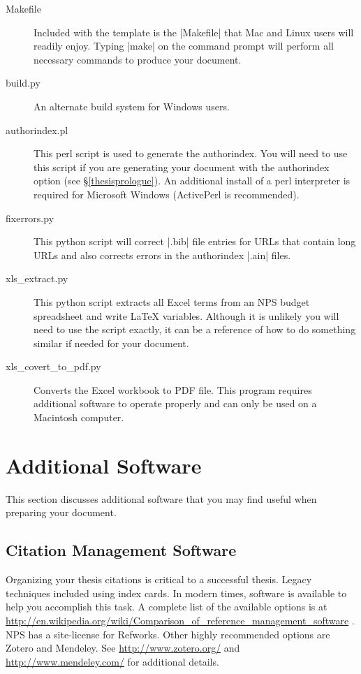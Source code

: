 \begin{description}
\item[Makefile] Included with the template is the |Makefile| that Mac and Linux users will readily enjoy.  Typing |make| on the command prompt will perform all necessary commands to produce your document.

\item[build.py] An alternate build system for Windows users.

\item[authorindex.pl] This perl script is used to generate the
  authorindex.  You will need to use this script if you are generating
  your document with the authorindex option (see
  \S\ref{thesisprologue}).  An additional install of a perl
  interpreter is required for Microsoft\textregistered{} Windows
  (ActivePerl\textregistered{} is recommended).

\item[fixerrors.py] This python script will correct |.bib| file entries for URLs that contain long URLs and also corrects errors in the authorindex |.ain| files.

\item[xls\_extract.py] This python script extracts all Excel terms from an NPS budget spreadsheet and write \LaTeX{} variables.
  Although it is unlikely you will need to use the script exactly, it can be a reference of how to do something similar if needed for your document.

\item[xls\_covert\_to\_pdf.py] Converts the Excel workbook to PDF
  file. This program requires additional software to operate properly
  and can only be used on a Macintosh computer.
\end{description}

\section{Additional Software}
This section discusses additional software that you may find useful
when preparing your document.
\subsection{Citation Management Software}
Organizing your thesis citations is critical to a successful thesis.  Legacy techniques included using index cards.
In modern times, software is available to help you accomplish this task.  A complete list of the available options is
at \url{http://en.wikipedia.org/wiki/Comparison_of_reference_management_software} .  NPS has a site-license for Refworks.
Other highly recommended options are Zotero and Mendeley.  See \url{http://www.zotero.org/} and \url{http://www.mendeley.com/}
for additional details.
   
